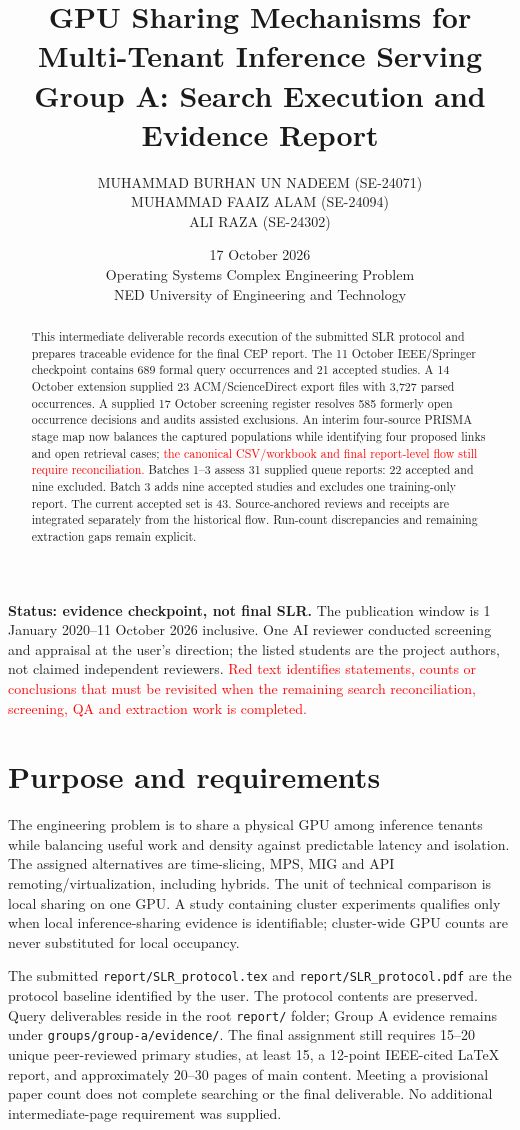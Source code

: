 \documentclass[12pt,a4paper]{article}
\title{GPU Sharing Mechanisms for Multi-Tenant Inference Serving\\\large Group A: Search Execution and Evidence Report}
\author{MUHAMMAD BURHAN UN NADEEM (SE-24071)\\MUHAMMAD FAAIZ ALAM (SE-24094)\\ALI RAZA (SE-24302)}
\date{17 October 2026\\Operating Systems Complex Engineering Problem\\NED University of Engineering and Technology}
\newcommand{\pending}[1]{\textcolor{red}{#1}}
\begin{document}
\maketitle
\begin{abstract}
This intermediate deliverable records execution of the submitted SLR protocol and prepares traceable evidence for the final CEP report. The 11 October IEEE/Springer checkpoint contains 689 formal query occurrences and 21 accepted studies. A 14 October extension supplied 23 ACM/ScienceDirect export files with 3,727 parsed occurrences. A supplied 17 October screening register resolves 585 formerly open occurrence decisions and audits assisted exclusions. An interim four-source PRISMA stage map now balances the captured populations while identifying four proposed links and open retrieval cases; \pending{the canonical CSV/workbook and final report-level flow still require reconciliation.} Batches 1--3 assess 31 supplied queue reports: 22 accepted and nine excluded. Batch 3 adds nine accepted studies and excludes one training-only report. The current accepted set is 43. Source-anchored reviews and receipts are integrated separately from the historical flow. Run-count discrepancies and remaining extraction gaps remain explicit.
\end{abstract}
\textbf{Status: evidence checkpoint, not final SLR.} The publication window is 1 January 2020--11 October 2026 inclusive. One AI reviewer conducted screening and appraisal at the user's direction; the listed students are the project authors, not claimed independent reviewers. \pending{Red text identifies statements, counts or conclusions that must be revisited when the remaining search reconciliation, screening, QA and extraction work is completed.}
\newpage\tableofcontents\newpage
\section{Purpose and requirements}
The engineering problem is to share a physical GPU among inference tenants while balancing useful work and density against predictable latency and isolation. The assigned alternatives are time-slicing, MPS, MIG and API remoting/virtualization, including hybrids. The unit of technical comparison is local sharing on one GPU. A study containing cluster experiments qualifies only when local inference-sharing evidence is identifiable; cluster-wide GPU counts are never substituted for local occupancy.

The submitted \texttt{report/SLR\_protocol.tex} and \texttt{report/SLR\_protocol.pdf} are the protocol baseline identified by the user. The protocol contents are preserved. Query deliverables reside in the root \texttt{report/} folder; Group A evidence remains under \texttt{groups/group-a/evidence/}. The final assignment still requires 15--20 unique peer-reviewed primary studies, at least 15, a 12-point IEEE-cited LaTeX report, and approximately 20--30 pages of main content. Meeting a provisional paper count does not complete searching or the final deliverable. No additional intermediate-page requirement was supplied.
\end{document}
